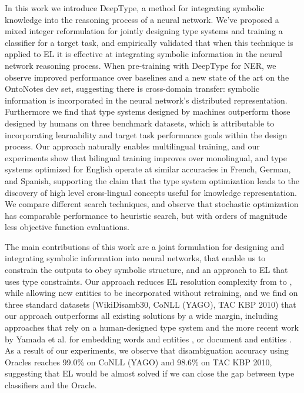 \documentclass[letterpaper]{article}
\begin{document}
In this work we introduce DeepType, a method for integrating symbolic knowledge into the reasoning process of a neural network. We've proposed a mixed integer reformulation for jointly designing type systems and training a classifier for a target task, and empirically validated that when this technique is applied to EL it is effective at integrating symbolic information in the neural network reasoning process.
When pre-training with DeepType for NER, we observe improved performance over baselines and a new state of the art on the OntoNotes dev set, suggesting there is cross-domain transfer: symbolic information is incorporated in the neural network's distributed representation.
Furthermore we find that type systems designed by machines outperform those designed by humans on three benchmark datasets, which is attributable to incorporating learnability and target task performance goals within the design process.
Our approach naturally enables multilingual training, and our experiments show that bilingual training improves over monolingual, and type systems optimized for English operate at similar accuracies in French, German, and Spanish, supporting the claim that the type system optimization leads to the discovery of high level cross-lingual concepts useful for knowledge representation.
We compare different search techniques, and observe that stochastic optimization has comparable performance to heuristic search, but with orders of magnitude less objective function evaluations.

The main contributions of this work are a joint formulation for designing and integrating symbolic information into neural networks, that enable us to constrain the outputs to obey symbolic structure, and an approach to EL that uses type constraints. Our approach reduces EL resolution complexity from  to , while allowing new entities to be incorporated without retraining, and we find on three standard datasets (WikiDisamb30, CoNLL (YAGO), TAC KBP 2010) that our approach outperforms all existing solutions by a wide margin, including approaches that rely on a human-designed type system \cite{ling2015design} and the more recent work by Yamada et al. for embedding words and entities \cite{yamada2016joint}, or document and entities \cite{yamada2017learning}. As a result of our experiments, we observe that disambiguation accuracy using Oracles reaches 99.0\% on CoNLL (YAGO) and 98.6\% on TAC KBP 2010, suggesting that EL would be almost solved if we can close the gap between type classifiers and the Oracle.
\end{document}
